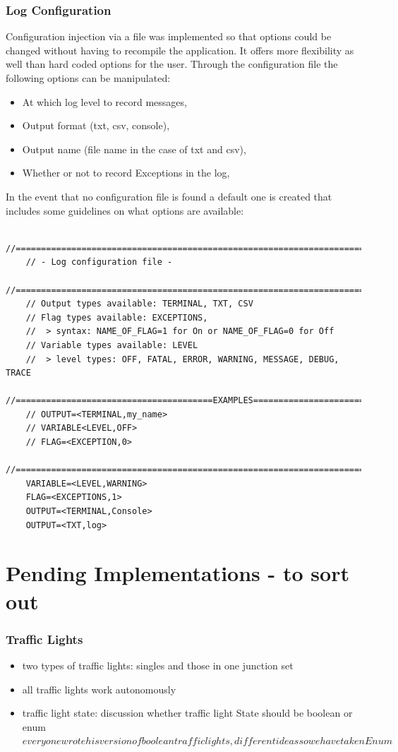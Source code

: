\subsubsection{Log Configuration}

Configuration injection via a file was implemented so that options could be changed without having to recompile the application. It offers more flexibility as well than hard coded options for the user. Through the configuration file the following options can be manipulated:

\begin{itemize}
   	\item At which log level to record messages,
   	\item Output format (txt, csv, console),
   	\item Output name (file name in the case of txt and csv),
   	\item Whether or not to record Exceptions in the log,
\end{itemize}

In the event that no configuration file is found a default one is created that includes some guidelines on what options are available:

\begin{lstlisting}
	//======================================================================================
	// - Log configuration file - 
	//======================================================================================
	// Output types available: TERMINAL, TXT, CSV
	// Flag types available: EXCEPTIONS,
	// 	> syntax: NAME_OF_FLAG=1 for On or NAME_OF_FLAG=0 for Off
	// Variable types available: LEVEL
	// 	> level types: OFF, FATAL, ERROR, WARNING, MESSAGE, DEBUG, TRACE
	//=======================================EXAMPLES=======================================
	// OUTPUT=<TERMINAL,my_name>
	// VARIABLE<LEVEL,OFF>
	// FLAG=<EXCEPTION,0>
	//======================================================================================
	VARIABLE=<LEVEL,WARNING>
	FLAG=<EXCEPTIONS,1>
	OUTPUT=<TERMINAL,Console>
	OUTPUT=<TXT,log>
\end{lstlisting}


\section{Pending Implementations - to sort out}

\subsubsection{Traffic Lights}
\begin{itemize}
    \item two types of traffic lights: singles and those in one junction set
    \item all traffic lights work autonomously
	\item traffic light state: discussion whether traffic light State should be boolean or enum \(everyone wrote his version of boolean traffic lights, different ideas so we have taken Enum\)
\end{itemize}

